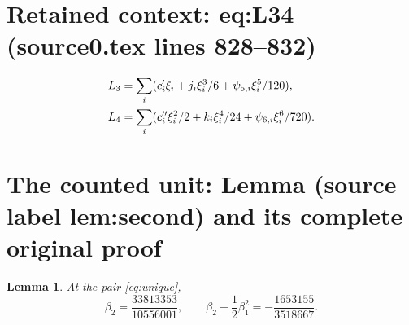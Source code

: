 \documentclass[10pt,a4paper]{amsart}
\theoremstyle{plain}
\newtheorem{lemma}[theorem]{Lemma}
\theoremstyle{remark}
\begin{document}
\section*{Retained context: eq:L34 (source0.tex lines 828--832)}

\begin{align}
 L_3&=\sum_i(c_i'\xi_i+j_i\xi_i^3/6+\psi_{5,i}\xi_i^5/120),\notag\\
 L_4&=\sum_i(c_i''\xi_i^2/2+k_i\xi_i^4/24+\psi_{6,i}\xi_i^6/720).
 \label{eq:L34}
\end{align}


\section{The counted unit: Lemma (source label lem:second) and its complete original proof}

\begin{lemma}\label{lem:second}
At the pair \eqref{eq:unique},
\begin{equation}\label{eq:beta2value}
 \beta_2=\frac{33813353}{10556001},\qquad
 \beta_2-\frac12\beta_1^2=-\frac{1653155}{3518667}.
\end{equation}
\end{lemma}
\end{document}
